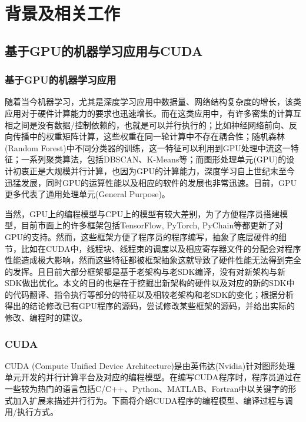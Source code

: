 \newpage
\section{背景及相关工作}
\setcounter{table}{0}
\setcounter{figure}{0}
\subsection{基于GPU的机器学习应用与CUDA}

\subsubsection{基于GPU的机器学习应用}
\par 随着当今机器学习，尤其是深度学习应用中数据量、网络结构复杂度的增长，该类应用对于硬件计算能力的要求也迅速增长。而在这类应用中，有许多密集的计算互相之间是没有数据/控制依赖的，也就是可以并行执行的；比如神经网络前向、反向传播中的权重矩阵计算，这些权重在同一轮计算中不存在耦合性；随机森林(Random Forest)中不同分类器的训练，这一特征可以利用到GPU处理中流这一特征；一系列聚类算法，包括DBSCAN、K-Means等；而图形处理单元(GPU)的设计初衷正是大规模并行计算，也因为GPU的计算能力，深度学习自上世纪末至今迅猛发展，同时GPU的运算性能以及相应的软件的发展也非常迅速。目前，GPU更多代表了通用处理单元(General Purpose)。
\par 当然，GPU上的编程模型与CPU上的模型有较大差别，为了方便程序员搭建模型，目前市面上的许多框架包括TensorFlow, PyTorch, PyChain等都更新了对GPU的支持。然而，这些框架方便了程序员的程序编写，抽象了底层硬件的细节，比如在CUDA中，线程块、线程束的调度以及相应寄存器文件的分配会对程序性能造成极大影响，然而这些特征都被框架抽象这就导致了硬件性能无法得到完全的发挥。且目前大部分框架都是基于老架构与老SDK编译，没有对新架构与新SDK做出优化。本文的目的也是在于挖掘出新架构的硬件以及对应的新的SDK中的代码翻译、指令执行等部分的特征以及相较老架构和老SDK的变化；根据分析得出的结论修改已有GPU程序的源码，尝试修改某些框架的源码，并给出实际的修改、编程时的建议。
\subsubsection{CUDA}
\par CUDA (Compute Unified Device Architecture)是由英伟达(Nvidia)针对图形处理单元开发的并行计算平台及对应的编程模型。在编写CUDA程序时，程序员通过在一些较为热门的语言包括C/C++、Python、MATLAB、Fortran中以关键字的形式加入扩展来描述并行行为\parencite{CUDAZONE}。下面将介绍CUDA程序的编程模型、编译过程与调用/执行方式。
